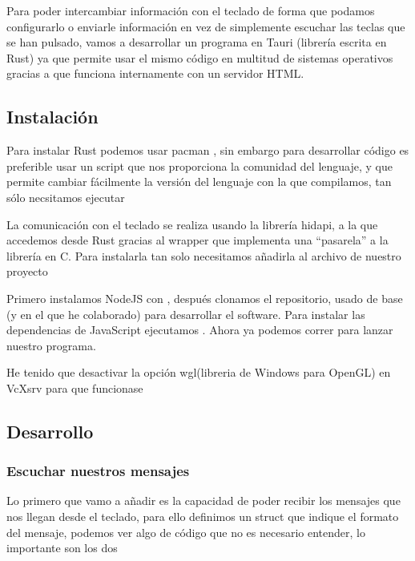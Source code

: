 Para poder intercambiar información con el teclado de forma que podamos configurarlo o enviarle información en vez de simplemente escuchar las teclas que se han pulsado, vamos a desarrollar un programa en Tauri\cite{tauri} (librería escrita en Rust\cite{rust}) ya que permite usar el mismo código en multitud de sistemas operativos gracias a que funciona internamente con un servidor HTML. 

\subsection{Instalación}
Para instalar Rust podemos usar pacman , sin embargo para desarrollar código es preferible usar un script que nos proporciona la comunidad del lenguaje, y que permite cambiar fácilmente la versión del lenguaje con la que compilamos, tan sólo necsitamos ejecutar\newline
{} \vspace{.1cm}\newline

La comunicación con el teclado se realiza usando la librería hidapi\cite{hidapi}, a la que accedemos desde Rust gracias al wrapper\cite{hidapi-rs} que implementa una ``pasarela'' a la librería en C. Para instalarla tan solo necesitamos añadirla al archivo  de nuestro proyecto \vspace{0.1cm}\newline

Primero instalamos NodeJS\cite{nodejs} con , después clonamos el repositorio\cite{karl-xap}, usado de base (y en el que he colaborado) para desarrollar el software. \newline 
Para instalar las dependencias de JavaScript ejecutamos . Ahora ya podemos correr  para lanzar nuestro programa. \par

\hr
He tenido que desactivar la opción wgl(libreria de Windows para OpenGL) en VcXsrv para que funcionase
\hr

\subsection{Desarrollo}
    \subsubsection{Escuchar nuestros mensajes}
    Lo primero que vamo a añadir es la capacidad de poder recibir los mensajes que nos llegan desde el teclado, para ello definimos un struct que indique el formato del mensaje, podemos ver algo de código que no es necesario entender, lo importante son los dos  \newline

